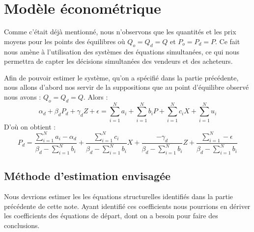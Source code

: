 \documentclass[11pt, a4paper]{article}
\begin{document}
\section*{Modèle économétrique}
Comme c'était déjà mentionné, nous n'observons que les quantités et les prix moyens pour les points des équilibres où $Q_o = Q_d = Q$ et $P_o = P_d = P$.
Ce fait nous amène à l'utilisation des systèmes des équations simultanées, ce qui nous permettra de capter les décisions simultanées des vendeurs et des acheteurs. 
\par
Afin de pouvoir estimer le système, qu'on a spécifié dans la partie précédente, nous allons d'abord nos servir de la suppositions que au point d'équilibre observé nous avons : $Q_o = Q_d = Q$.
Alors : 
\begin{equation}
    \alpha_d + \beta_d P_d + \gamma_d Z + \epsilon = 
        \sum_{i = 1}^{N} a_i + \sum_{i = 1}^{N} b_i P + \sum_{i = 1}^{N} c_i X + \sum_{i = 1}^{N} u_i
\end{equation}
D'où on obtient :
\begin{equation}
    P_d = \frac{\sum_{i = 1}^{N} a_i - \alpha_d}{\beta_d - \sum_{i = 1}^{N} b_i} + 
        \frac{\sum_{i = 1}^{N} c_i}{\beta_d - \sum_{i = 1}^{N} b_i} X +
        \frac{-\gamma_d}{\beta_d - \sum_{i = 1}^{N} b_i} Z + 
        \frac{\sum_{i = 1}^{N} - \epsilon}{\beta_d - \sum_{i = 1}^{N} b_i}
\end{equation}

\subsection*{Méthode d'estimation envisagée}
Nous devrions estimer les les équations structurelles identifiés dans la partie précédente de cette note. 
Ayant identifié ces coefficients nous pourrions en dériver les coefficients des équations de départ, dont on a besoin pour faire des conclusions.

\end{document}
